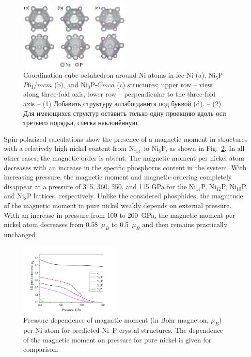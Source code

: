 \documentclass[twoside,twocolumn,9pt]{article}
\begin{document}
\begin{figure}
	\includegraphics[width=0.5\textwidth]{str_ss}
	\caption{Coordination cube-octahedron around Ni atoms in fcc-Ni (a), Ni$_5$P-$P6_3/mcm$ (b), and Ni$_3$P-$Cmca$ (c) structures; upper row – view along three-fold axis, lower row – perpendicular to the three-fold axis
– (1) Добавить структуру  аллабогданита  под буквой (d). 
– (2) Для имеющихся структур оставить только одну проекцию вдоль оси третьего порядка, слегка наклонённую. }\label{f:strs}
\end{figure}


Spin-polarized calculations show the presence of a magnetic moment in structures with a relatively high nickel content from Ni$_{14}$ to Ni$_8$P, as shown in Fig.~\ref{fgr:magmom}. 
In all other cases, the magnetic order is absent. The magnetic moment per nickel atom decreases with an increase in the specific phosphorus content in the system. 
With increasing pressure, the magnetic moment and magnetic ordering completely disappear at a pressure of 315, 360, 350, and 115 GPa for the Ni$_{14}$P, Ni$_{12}$P, Ni$_{10}$P, and Ni$_8$P lattices, respectively. 
Unlike the considered phosphides, the magnitude of the magnetic moment in pure nickel weakly depends on external pressure. 
With an increase in pressure from 100 to 200~GPa, the magnetic moment per nickel atom decreases from 0.58~$\mu_B$ to 0.5~$\mu_B$ and then remains practically unchanged.

\begin{figure}[h]
\centering
  \includegraphics[width=0.45\textwidth]{magmom-uspex.jpg}
  \caption{Pressure dependence of magnatic moment (in Bohr magneton, $\mu_B$) per Ni atom for predicted Ni--P crystal structures.
  The dependence of the magnetic moment on pressure for pure nickel is given for comparison.
  }
  \label{fgr:magmom}
\end{figure}
\end{document}
